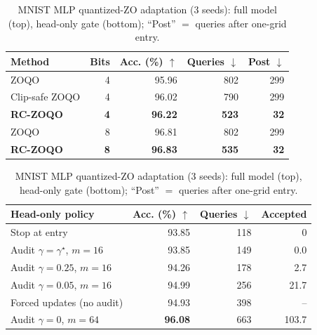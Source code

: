 \documentclass{article}
\begin{document}
\begin{table}[t]
\centering
\small
\renewcommand{\arraystretch}{0.92}
\setlength{\tabcolsep}{2.6pt}
\caption{MNIST MLP quantized-ZO adaptation (3 seeds): full model (top), head-only gate (bottom); ``Post'' $=$ queries after one-grid entry.}
\label{tab:real}
\begin{tabular}{lrrrr}
\toprule
Method & Bits & Acc. (\%) $\uparrow$ & Queries $\downarrow$ & Post $\downarrow$\\
\midrule
ZOQO & 4 & 95.96 & 802 & 299\\
Clip-safe ZOQO & 4 & 96.02 & 790 & 299\\
\textbf{RC-ZOQO} & \textbf{4} & \textbf{96.22} & \textbf{523} & \textbf{32}\\
ZOQO & 8 & 96.81 & 802 & 299\\
\textbf{RC-ZOQO} & \textbf{8} & \textbf{96.83} & \textbf{535} & \textbf{32}\\
\bottomrule
\end{tabular}

\vspace{1pt}
\begin{tabular}{lrrr}
\toprule
Head-only policy & Acc. (\%) $\uparrow$ & Queries $\downarrow$ & Accepted\\
\midrule
Stop at entry & 93.85 & 118 & 0\\
Audit $\gamma=\gamma^\star$, $m=16$ & 93.85 & 149 & 0.0\\
Audit $\gamma=0.25$, $m=16$ & 94.26 & 178 & 2.7\\
Audit $\gamma=0.05$, $m=16$ & 94.99 & 256 & 21.7\\
Forced updates (no audit) & 94.93 & 398 & {--}\\
Audit $\gamma=0$, $m=64$ & \textbf{96.08} & 663 & 103.7\\
\bottomrule
\end{tabular}
\end{table}
\end{document}
